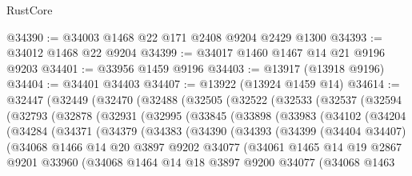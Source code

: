 \begin{lexlean}{RustCore}
\begin{coremodule}
@34390 := @34003 @1468 @22 @171 @2408 @9204 @2429 @1300
@34393 := @34012 @1468 @22 @9204
@34399 := @34017 @1460 @1467 @14 @21 @9196 @9203
@34401 := @33956 @1459 @9196
@34403 := @13917 (@13918 @9196)
@34404 := @34401 @34403
@34407 := @13922 (@13924 @1459 @14)
@34614 := @32447
    (@32449
      (@32470
        (@32488
          (@32505
            (@32522
              (@32533
                (@32537
                  (@32594
                    (@32793
                      (@32878
                        (@32931
                          (@32995
                            (@33845
                              (@33898
                                (@33983
                                  (@34102
                                    (@34204
                                      (@34284
                                        (@34371
                                          (@34379
                                            (@34383
                                              (@34390
                                                (@34393
                                                  (@34399
                                                    (@34404 @34407)
                                                    (@34068
                                                      @1466
                                                      @14
                                                      @20
                                                      @3897
                                                      @9202
                                                      @34077
                                                      (@34061
                                                        @1465
                                                        @14
                                                        @19
                                                        @2867
                                                        @9201
                                                        @33960
                                                        (@34068
                                                          @1464
                                                          @14
                                                          @18
                                                          @3897
                                                          @9200
                                                          @34077
                                                          (@34068
                                                            @1463

\end{coremodule}
\end{lexlean}
